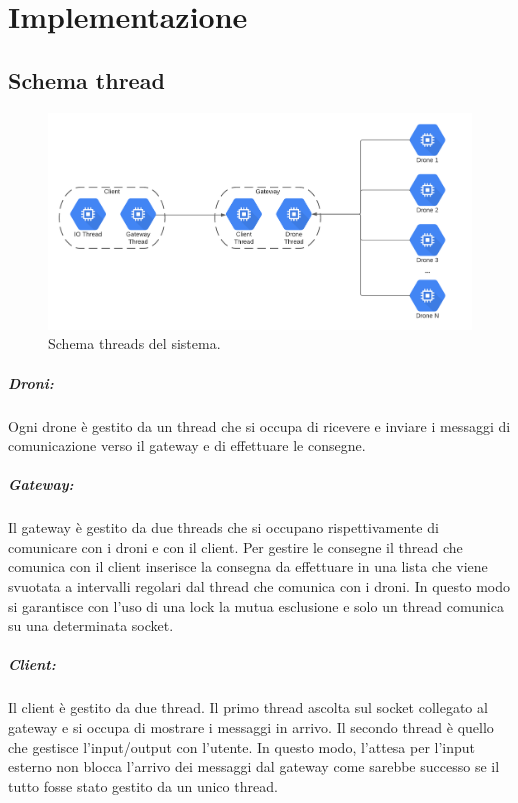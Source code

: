 \documentclass[a4paper,12pt]{report}
\begin{document}
\chapter{Implementazione}
\section{Schema thread}
\begin{figure}[H]
	\centering{}
	\includegraphics[width=\textwidth]{img/threads.pdf}
	\caption{Schema threads del sistema.}
	\label{img:scheletro}
\end{figure}

\paragraph*{Droni:} Ogni drone è gestito da un thread che si occupa di ricevere e inviare i messaggi di comunicazione verso il gateway e di effettuare le consegne.
\paragraph*{Gateway:} Il gateway è gestito da due threads che si occupano rispettivamente di comunicare con i droni e con il client. Per gestire le consegne il thread che comunica
con il client inserisce la consegna da effettuare in una lista che viene svuotata a intervalli regolari dal thread che comunica con i droni. In questo modo
si garantisce con l'uso di una lock la mutua esclusione e solo un thread comunica su una determinata socket.
\paragraph*{Client:} Il client è gestito da due thread. Il primo thread ascolta sul socket collegato al gateway e si occupa di mostrare i messaggi in arrivo. 
Il secondo thread è quello che gestisce l'input/output con l'utente. In questo modo, l'attesa per l'input esterno non blocca l'arrivo dei messaggi dal gateway 
come sarebbe successo se il tutto fosse stato gestito da un unico thread.
\end{document}

